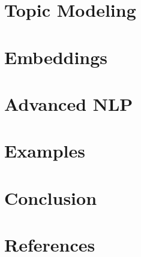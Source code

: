 \section[Topic]{Topic Modeling}




\section[Embed]{Embeddings}


\section[Adv]{Advanced NLP}





\section[Ex]{Examples}


\section[End]{Conclusion}


\section[Refs]{References}

